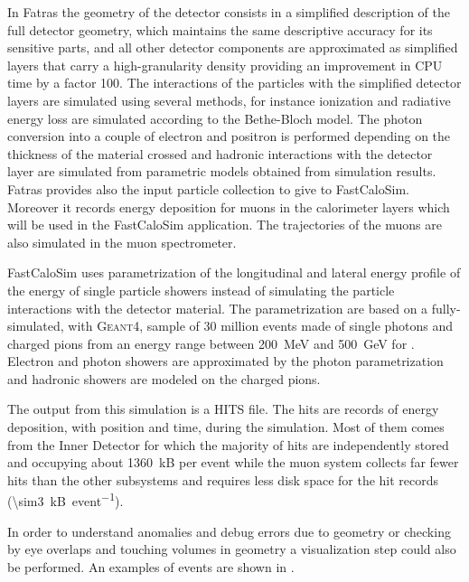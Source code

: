In Fatras the geometry of the detector consists in a simplified description of the full detector geometry, which maintains the same descriptive accuracy for its sensitive parts, and all other detector components are approximated as simplified layers that carry a high-granularity density providing an improvement in CPU time by a factor \num{100}. The interactions of the particles with the simplified detector layers are simulated using several methods, for instance ionization and radiative energy loss are simulated according to the Bethe-Bloch model. The photon conversion into a couple of electron and positron is performed depending on the thickness of the material crossed and hadronic interactions with the detector layer are simulated from parametric models obtained from \geant simulation results. Fatras provides also the input particle collection to give to FastCaloSim. Moreover it records energy deposition for muons in the calorimeter layers which will be used in the FastCaloSim application. The trajectories of the muons are also simulated in the muon spectrometer.

FastCaloSim uses parametrization of the longitudinal and lateral energy profile of the energy of single particle showers instead of simulating the particle interactions with the detector material. The parametrization are based on a fully-simulated, with \textsc{Geant4}, sample of 30 million events made of single photons and charged pions from an energy range between \SI{200}{\MeV} and \SI{500}{\GeV} for . Electron and photon showers are approximated by the photon parametrization and hadronic showers are modeled on the charged pions.

The output from this simulation is a HITS file. The hits are records of energy deposition, with position and time, during the simulation. Most of them comes from the Inner Detector for which the majority of hits are independently stored and occupying about \SI{1360}{kB} per event while the muon system collects far fewer hits than the other subsystems and requires less disk space for the hit records (\SI{\sim3}{kB\per event}).

In order to understand anomalies and debug errors due to geometry or checking by eye overlaps and touching volumes in geometry a visualization step could also be performed. An examples of events are shown in \Fig{\ref{fig:simulation}}.

